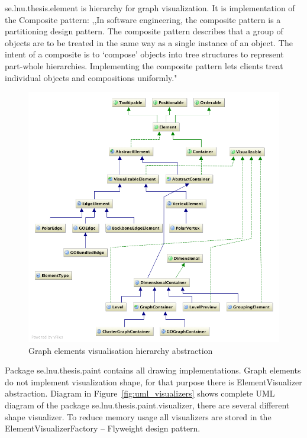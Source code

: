 \textsf{se.lnu.thesis.element} is hierarchy for graph visualization. It is implementation of the Composite pattern: ,,In software engineering, the composite pattern is a partitioning design pattern. The composite pattern describes that a group of objects are to be treated in the same way as a single instance of an object. The intent of a composite is to `compose' objects into tree structures to represent part-whole hierarchies. Implementing the composite pattern lets clients treat individual objects and compositions uniformly."~\cite{COMPOSITE_GAMMA}

\begin{figure}[h!]
\centering
\includegraphics[scale=0.4]{pictures/uml_elements.png}
\caption{Graph elements visualisation hierarchy abstraction}
\label{fig:uml_elements}
\end{figure}

Package \textsf{se.lnu.thesis.paint} contains all drawing implementations.
Graph elements do not implement visualization shape, for that purpose there is \textsf{ElementVisualizer} abstraction. Diagram in Figure~\ref{fig:uml_visualizers} shows complete UML diagram of the package \textsf{se.lnu.thesis.paint.visualizer}, there are several different shape visualizer. To reduce memory usage all visualizers are stored in the \textsf{ElementVisualizerFactory} -- Flyweight design pattern.

